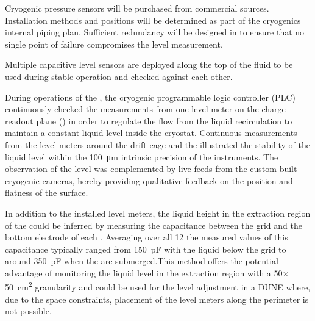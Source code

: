 Cryogenic pressure sensors will be purchased from commercial sources.
Installation methods and positions will be determined as part of the
cryogenics internal piping plan.  Sufficient redundancy will be designed in
to ensure that no single point of failure compromises the level measurement.

Multiple capacitive level sensors are deployed along the top of
the fluid to be used during stable operation and checked against each
other.

During operations of the , the cryogenic programmable logic controller (PLC) continuously checked the measurements from one level meter on the charge readout plane () in order to regulate the flow from the liquid recirculation to maintain a constant liquid level inside the cryostat. Continuous measurements from the level meters around the drift cage and the  illustrated the stability of the liquid level within the \SI{100}{\micro\meter} intrinsic precision of the instruments. The observation of the level was complemented by live feeds from the custom built cryogenic cameras, hereby providing qualitative feedback on the position and flatness of the surface.

In addition to the installed level meters, the liquid height in the extraction region of the  could be inferred by measuring the capacitance between the grid and the bottom electrode of each . Averaging over all \num{12}  the measured values of this capacitance typically ranged from \SI{150}{pF} with the liquid below the grid to around  \SI{350}{pF}  when the  are submerged.This method offers the potential advantage of monitoring the liquid level in the  extraction region with a \num{50}$\times$\SI{50}{\cm^2} granularity and could be used for the  level adjustment in a DUNE  where, due to the space constraints, placement of the level meters along the  perimeter is not possible.
